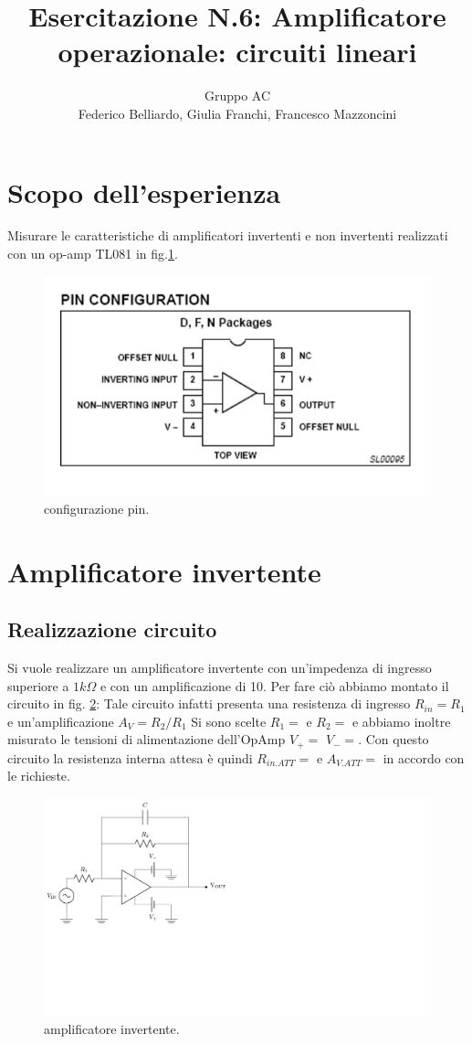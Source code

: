 \documentclass[10pt,a4paper]{article}
\author{Gruppo AC \\ Federico Belliardo, Giulia Franchi, Francesco Mazzoncini}
\title{Esercitazione N.6: Amplificatore operazionale: circuiti lineari}
\begin{document}
\section{Scopo dell'esperienza}

Misurare le caratteristiche di amplificatori invertenti e non invertenti realizzati con un op-amp TL081 in fig.\ref{pin}.
\begin{figure}[!htb]
  \centering
  \includegraphics[scale=0.3]{pinrelaz6.png}
\caption{configurazione pin.}
\label{pin}
\end{figure}

\section{Amplificatore invertente}
\subsection{Realizzazione circuito}
Si vuole realizzare un amplificatore invertente con un'impedenza di ingresso superiore a $1k\Omega$ e con un amplificazione di 10. 
Per fare ciò abbiamo montato il circuito in fig. \ref{opampinvert}: Tale circuito infatti presenta una  resistenza di ingresso $R_{in}=R_1$ e un'amplificazione  $A_V=R_2/R_1$ 
Si sono scelte $R_1=$ e $R_2=$ e abbiamo inoltre misurato le  tensioni di alimentazione dell'OpAmp $V_+=$ $V_-=$.
Con questo circuito la resistenza interna attesa è quindi $R_{in.ATT}=$ e $A_{V.ATT}=$ in accordo con le richieste.
\begin{figure}[!htb]
  \centering
  \includegraphics[scale=0.5]{opampinvert.png}
\caption{amplificatore invertente.}
\label{opampinvert}
\end{figure}
\end{document}
